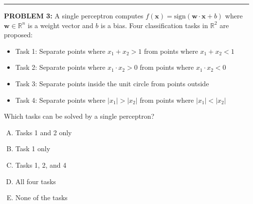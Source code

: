 \documentclass[12pt]{amsart}
\newcommand{\divider}{
  \vspace{-1em} %
  \noindent
  \raisebox{-0.15ex}{\textbullet}%
  \hspace{0.5em}%
  \rule[0.5ex]{0.95\textwidth}{1.0pt}%
  \hspace{0.5em}%
  \raisebox{-0.15ex}{\textbullet}%
  \vspace{0em} %
}
\begin{document}
\divider

{\bf PROBLEM 3:}
%
A single perceptron computes $f(\mathbf{x}) = \text{sign}(\mathbf{w} \cdot \mathbf{x} + b)$ where $\mathbf{w} \in \mathbb{R}^n$ is a weight vector and $b$ is a bias. Four classification tasks in $\mathbb{R}^2$ are proposed:

\begin{itemize}
\item Task 1: Separate points where $x_1 + x_2 > 1$ from points where $x_1 + x_2 < 1$
\item Task 2: Separate points where $x_1 \cdot x_2 > 0$ from points where $x_1 \cdot x_2 < 0$
\item Task 3: Separate points inside the unit circle from points outside
\item Task 4: Separate points where $|x_1| > |x_2|$ from points where $|x_1| < |x_2|$
\end{itemize}

Which tasks can be solved by a single perceptron?

\begin{enumerate}[(A)]
\item Tasks 1 and 2 only
\item Task 1 only
\item Tasks 1, 2, and 4
\item All four tasks
\item None of the tasks
\end{enumerate}

\end{document}
